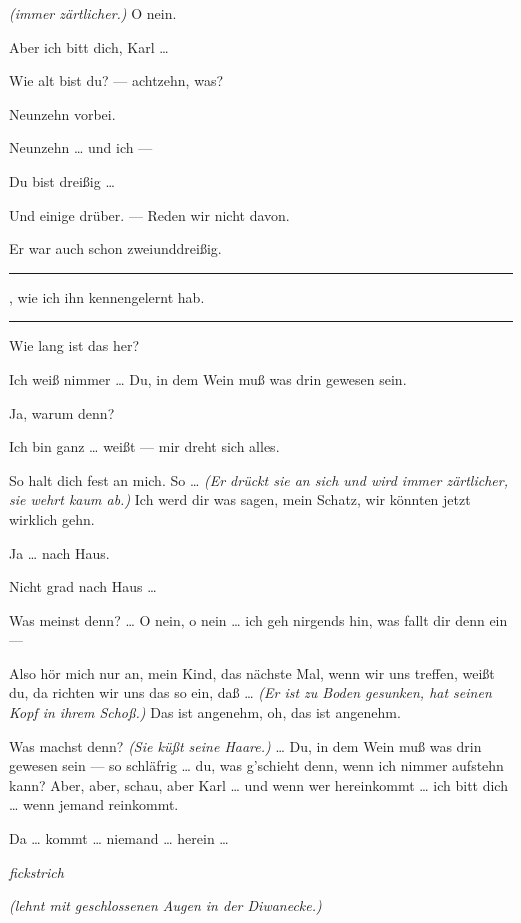 \documentclass[
	final,
	a4paper,
	ngerman,
	mpinclude = true, %
	twoside = true,
	open = right,
	cleardoublepage = plain,
	DIV = 13,
	BCOR = 1cm,
	titlepage = firstiscover,
	]{scrbook}
\newcommand{\direction}[1]{\textit{(#1)}}
\newcommand{\hiat}{%
	\begin{center}
		\tiny
		\raisebox{0.5ex}{\rule{0.3\linewidth}{0.4pt}}
		\textit{fickstrich}
		\raisebox{0.5ex}{\rule{0.3\linewidth}{0.4pt}}
	\end{center}
}
\newenvironment{deletion}{%
		\vspace{0.25\baselineskip}
		\hrule
		\vspace{0.25\baselineskip}
		\color{darkgray}
	}{
		\color{black}
		\vspace{0.25\baselineskip}
		\hrule 
		\vspace{0.25\baselineskip}
	}
\newcommand{\thecharacter}[1]{\textup{\textsc{#1}}\xspace}
\newcommand{\thegatte}{\thecharacter{Christian}}
\newcommand{\thesuesse}{\thecharacter{Lola}}
\newcommand{\character}[1]{\item[#1:]}
\newcommand{\gatte}{\character{\thegatte}}
\newcommand{\suesse}{\character{\thesuesse}}
\begin{document}
\begin{play}
	\gatte
	\direction{immer zärtlicher.} O nein.

	\suesse
	Aber ich bitt dich, Karl \ldots{}

	\gatte
	Wie alt bist du? --- achtzehn, was?

	\suesse
	Neunzehn vorbei.

	\gatte
	Neunzehn \ldots{} und ich ---

	\suesse
	Du bist dreißig \ldots{}

	\gatte
	Und einige drüber. --- Reden wir nicht davon.

	\suesse
	Er war auch schon zweiunddreißig.
	\begin{deletion}
	, wie ich ihn kennengelernt hab.
	\end{deletion}

	\gatte
	Wie lang ist das her?

	\suesse
	Ich weiß nimmer \ldots{} Du, in dem Wein muß was drin gewesen sein.

	\gatte
	Ja, warum denn?

	\suesse
	Ich bin ganz \ldots{} weißt --- mir dreht sich alles.

	\gatte
	So halt dich fest an mich. So \ldots{} \direction{Er drückt sie an sich und wird immer zärtlicher, sie wehrt kaum ab.} Ich werd dir was sagen, mein Schatz, wir könnten jetzt wirklich gehn.

	\suesse
	Ja \ldots{} nach Haus.

	\gatte
	Nicht grad nach Haus \ldots{}

	\suesse
	Was meinst denn? \ldots{} O nein, o nein \ldots{} ich geh nirgends hin, was fallt dir denn ein ---

	\gatte
	Also hör mich nur an, mein Kind, das nächste Mal, wenn wir uns treffen, weißt du, da richten wir uns das so ein, daß \ldots{} \direction{Er ist zu Boden gesunken, hat seinen Kopf in ihrem Schoß.} Das ist angenehm, oh, das ist angenehm.

	\suesse
	Was machst denn? \direction{Sie küßt seine Haare.} \ldots{} Du, in dem Wein muß was drin gewesen sein --- so schläfrig \ldots{} du, was g'schieht denn, wenn ich nimmer aufstehn kann? Aber, aber, schau, aber Karl \ldots{} und wenn wer hereinkommt \ldots{} ich bitt dich \ldots{} wenn jemand reinkommt.

	\gatte
	Da \ldots{} kommt \ldots{} niemand \ldots{} herein \ldots{}

	\hiat

	\suesse
	\direction{lehnt mit geschlossenen Augen in der Diwanecke.}


\end{play}
\end{document}
